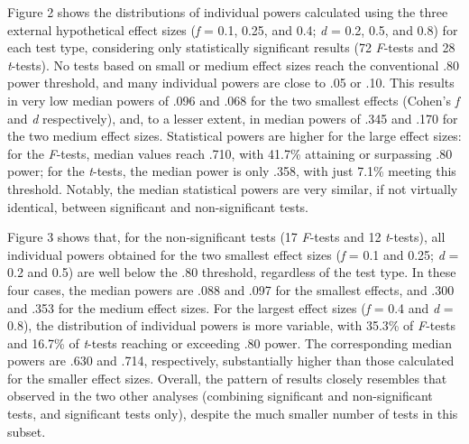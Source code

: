 \documentclass[authordate, meta]{jote-new-article}
\begin{document}
	Figure 2 shows the distributions of individual powers calculated using the three external hypothetical effect sizes (\emph{f} = 0.1, 0.25, and 0.4; \emph{d} = 0.2, 0.5, and 0.8) for each test type, considering only statistically significant results (72 \emph{F}-tests and 28 \emph{t}-tests). No tests based on small or medium effect sizes reach the conventional .80 power threshold, and many individual powers are close to .05 or .10. This results in very low median powers of .096 and .068 for the two smallest effects (Cohen's \emph{f} and \emph{d} respectively), and, to a lesser extent, in median powers of .345 and .170 for the two medium effect sizes. Statistical powers are higher for the large effect sizes: for the \emph{F}-tests, median values reach .710, with 41.7\% attaining or surpassing .80 power; for the \emph{t}-tests, the median power is only .358, with just 7.1\% meeting this threshold. Notably, the median statistical powers are very similar, if not virtually identical, between significant and non-significant tests.



	Figure 3 shows that, for the non-significant tests (17 \emph{F}-tests and 12 \emph{t}-tests), all individual powers obtained for the two smallest effect sizes (\emph{f} = 0.1 and 0.25; \emph{d} = 0.2 and 0.5) are well below the .80 threshold, regardless of the test type. In these four cases, the median powers are .088 and .097 for the smallest effects, and .300 and .353 for the medium effect sizes. For the largest effect sizes (\emph{f} = 0.4 and \emph{d} = 0.8), the distribution of individual powers is more variable, with 35.3\% of \emph{F}-tests and 16.7\% of \emph{t}-tests reaching or exceeding .80 power. The corresponding median powers are .630 and .714, respectively, substantially higher than those calculated for the smaller effect sizes. Overall, the pattern of results closely resembles that observed in the two other analyses (combining significant and non-significant tests, and significant tests only), despite the much smaller number of tests in this subset.
\end{document}
